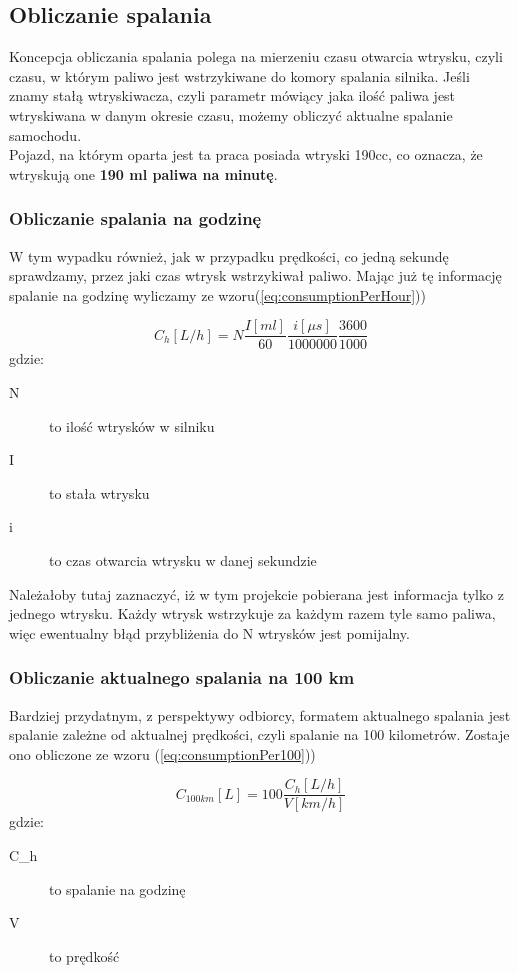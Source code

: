 \subsection{Obliczanie spalania} \label{calc_consumption}
Koncepcja obliczania spalania polega na mierzeniu czasu otwarcia wtrysku, czyli czasu, w którym paliwo jest wstrzykiwane do komory spalania silnika. Jeśli znamy stałą wtryskiwacza, czyli parametr mówiący jaka ilość paliwa jest wtryskiwana w danym okresie czasu, możemy obliczyć aktualne spalanie samochodu.\\
Pojazd, na którym oparta jest ta praca posiada wtryski 190cc, co oznacza, że wtryskują one \textbf{190 ml paliwa na minutę}.

\subsubsection{Obliczanie spalania na godzinę}
W tym wypadku również, jak w przypadku prędkości, co jedną sekundę sprawdzamy, przez jaki czas wtrysk wstrzykiwał paliwo. Mając już tę informację spalanie na godzinę wyliczamy ze wzoru(\ref{eq:consumptionPerHour}))

\begin{equation}\label{eq:consumptionPerHour}
C_{h}[L/h] = N\frac{I[ml]}{60}\frac{i[\mu s]}{1000000}\frac{3600}{1000}
\end{equation}
gdzie:
\begin{description}
\item[N] to ilość wtrysków w silniku
\item[I] to stała wtrysku
\item[i] to czas otwarcia wtrysku w danej sekundzie
\end{description}
Należałoby tutaj zaznaczyć, iż w tym projekcie pobierana jest informacja tylko z jednego wtrysku. Każdy wtrysk wstrzykuje za każdym razem tyle samo paliwa, więc ewentualny błąd przybliżenia do N wtrysków jest pomijalny.
\subsubsection{Obliczanie aktualnego spalania na 100 km}
Bardziej przydatnym, z perspektywy odbiorcy, formatem aktualnego spalania jest spalanie zależne od aktualnej prędkości, czyli spalanie na 100 kilometrów. Zostaje ono obliczone ze wzoru (\ref{eq:consumptionPer100}))

\begin{equation}\label{eq:consumptionPer100}
C_{100km}[L] = 100\frac{C_{h}[L/h]}{V[km/h]}
\end{equation}
gdzie:
\begin{description}
\item[C_{h}] to spalanie na godzinę
\item[V] to prędkość
\end{description}\\
